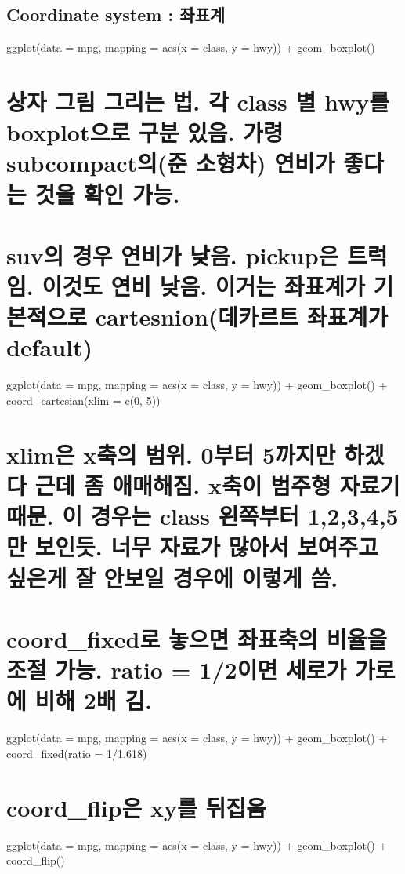 \documentclass[]{article}
\begin{document}
\subsection{Coordinate system : 좌표계}\label{coordinate-system-}

ggplot(data = mpg, mapping = aes(x = class, y = hwy)) + geom\_boxplot()

\section{상자 그림 그리는 법. 각 class 별 hwy를 boxplot으로 구분 있음.
가령 subcompact의(준 소형차) 연비가 좋다는 것을 확인
가능.}\label{---.--class--hwy-boxplot--.--subcompact------.}

\section{suv의 경우 연비가 낮음. pickup은 트럭임. 이것도 연비 낮음.
이거는 좌표계가 기본적으로 cartesnion(데카르트 좌표계가
default)}\label{suv---.-pickup-.---.----cartesnion--default}

ggplot(data = mpg, mapping = aes(x = class, y = hwy)) + geom\_boxplot()
+ coord\_cartesian(xlim = c(0, 5))

\section{xlim은 x축의 범위. 0부터 5까지만 하겠다 근데 좀 애매해짐. x축이
범주형 자료기 때문. 이 경우는 class 왼쪽부터 1,2,3,4,5만 보인듯. 너무
자료가 많아서 보여주고 싶은게 잘 안보일 경우에 이렇게
씀.}\label{xlim-x-.-0-5----.-x---.---class--12345-.----------.}

\section{coord\_fixed로 놓으면 좌표축의 비율을 조절 가능. ratio =
1/2이면 세로가 가로에 비해 2배
김.}\label{coord_fixed-----.-ratio-12----2-.}

ggplot(data = mpg, mapping = aes(x = class, y = hwy)) + geom\_boxplot()
+ coord\_fixed(ratio = 1/1.618)

\section{coord\_flip은 xy를 뒤집음}\label{coord_flip-xy-}

ggplot(data = mpg, mapping = aes(x = class, y = hwy)) + geom\_boxplot()
+ coord\_flip()
\end{document}
